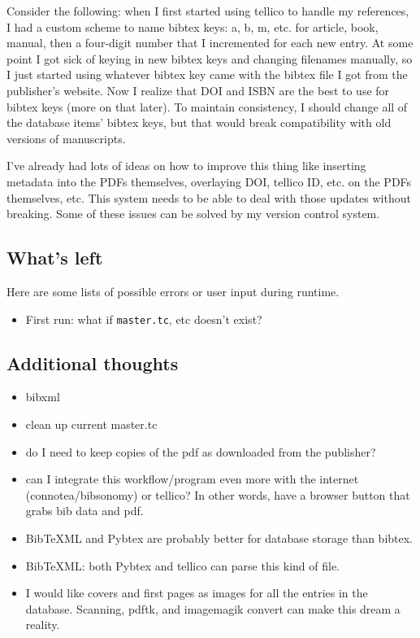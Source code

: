 \documentclass[letterpaper,12pt]{article}
\begin{document}
Consider the following: when I first started using tellico to handle my references, I had a custom scheme to name bibtex keys: a, b, m, etc. for article, book, manual, then a four-digit number that I incremented for each new entry. At some point I got sick of keying in new bibtex keys and changing filenames manually, so I just started using whatever bibtex key came with the bibtex file I got from the publisher's website. Now I realize that DOI and ISBN are the best to use for bibtex keys (more on that later). To maintain consistency, I should change all of the database items' bibtex keys, but that would break compatibility with old versions of manuscripts.

I've already had lots of ideas on how to improve this thing like inserting metadata into the PDFs themselves, overlaying DOI, tellico ID, etc. on the PDFs themselves, etc. This system needs to be able to deal with those updates without breaking. Some of these issues can be solved by my version control system.





\subsection{What's left}
Here are some lists of possible errors or user input during runtime.

\begin{itemize}
\item First run: what if \verb|master.tc|, etc doesn't exist?
\end{itemize}

\subsection{Additional thoughts}

\begin{itemize}
\item bibxml
\item clean up current master.tc
\item do I need to keep copies of the pdf as downloaded from the publisher?
\item can I integrate this workflow/program even more with the internet (connotea/bibsonomy) or tellico? In other words, have a browser button that grabs bib data and pdf.
\item BibTeXML and Pybtex are probably better for database storage than bibtex.
\item BibTeXML: both Pybtex and tellico can parse this kind of file.
\item I would like covers and first pages as images for all the entries in the database. Scanning, pdftk, and imagemagik convert can make this dream a reality.
\end{itemize}
\end{document}
